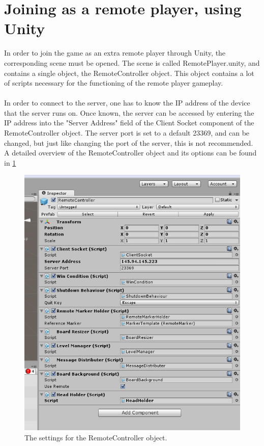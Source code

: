 \documentclass[]{report}
\begin{document}
\section*{Joining as a remote player, using Unity}
In order to join the game as an extra remote player through Unity, the corresponding
scene must be opened. The scene is called RemotePlayer.unity, and contains a single object,
the RemoteController object. This object contains a lot of scripts necessary
for the functioning of the remote player gameplay.\\
\\
In order to connect to the server, one has to know the IP address of the
device that the server runs on. Once known, the server can be accessed by
entering the IP address into the "Server Address" field of the Client Socket
component of the RemoteController object. The server port is set to a default
23369, and can be changed, but just like changing the port of the server,
this is not recommended. A detailed overview of the RemoteController object
and its options can be found in \ref{fig:remotecontroller}
\begin{figure}[!ht]
    \centering
    \includegraphics[scale = 0.6]{RemoteController}
    \caption{The settings for the RemoteController object.}
    \label{fig:remotecontroller}
\end{figure}
\end{document}
